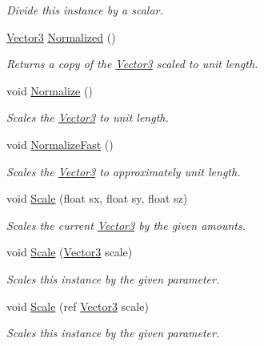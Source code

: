 \begin{DoxyCompactItemize}
\begin{DoxyCompactList}\small\item\em Divide this instance by a scalar.\end{DoxyCompactList}\item 
\hyperlink{struct_open_t_k_1_1_vector3}{Vector3} \hyperlink{struct_open_t_k_1_1_vector3_abcf916e2d79e87133fff9db5d11ed1fd}{Normalized} ()
\begin{DoxyCompactList}\small\item\em Returns a copy of the \hyperlink{struct_open_t_k_1_1_vector3}{Vector3} scaled to unit length. \end{DoxyCompactList}\item 
void \hyperlink{struct_open_t_k_1_1_vector3_ac717b081f161e5753bbd8eba76aba5c8}{Normalize} ()
\begin{DoxyCompactList}\small\item\em Scales the \hyperlink{struct_open_t_k_1_1_vector3}{Vector3} to unit length. \end{DoxyCompactList}\item 
void \hyperlink{struct_open_t_k_1_1_vector3_a18a963e086d42e1a569e77be89c6f495}{Normalize\-Fast} ()
\begin{DoxyCompactList}\small\item\em Scales the \hyperlink{struct_open_t_k_1_1_vector3}{Vector3} to approximately unit length. \end{DoxyCompactList}\item 
void \hyperlink{struct_open_t_k_1_1_vector3_ae6abd5842860c24f5e1f1636038ccdf5}{Scale} (float sx, float sy, float sz)
\begin{DoxyCompactList}\small\item\em Scales the current \hyperlink{struct_open_t_k_1_1_vector3}{Vector3} by the given amounts. \end{DoxyCompactList}\item 
void \hyperlink{struct_open_t_k_1_1_vector3_a6be524a212809a4f3785ab63e7bf816d}{Scale} (\hyperlink{struct_open_t_k_1_1_vector3}{Vector3} scale)
\begin{DoxyCompactList}\small\item\em Scales this instance by the given parameter.\end{DoxyCompactList}\item 
void \hyperlink{struct_open_t_k_1_1_vector3_a7af4b5254b970388b10d03805ad72647}{Scale} (ref \hyperlink{struct_open_t_k_1_1_vector3}{Vector3} scale)
\begin{DoxyCompactList}\small\item\em Scales this instance by the given parameter.\end{DoxyCompactList}\item 

\end{DoxyCompactItemize}
